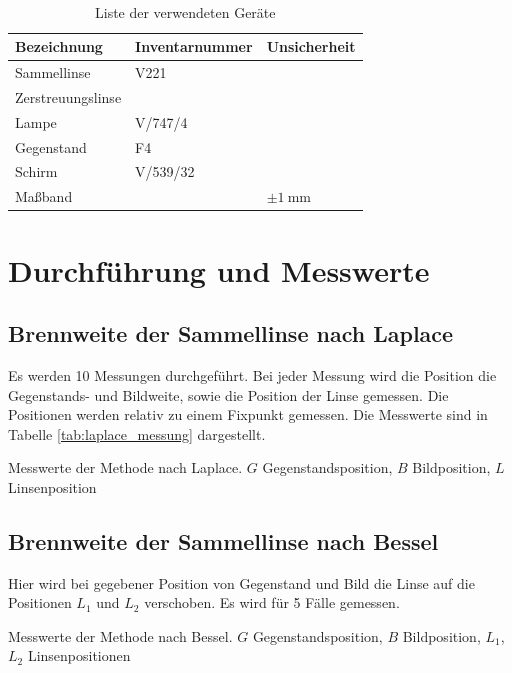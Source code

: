 \documentclass{article}
\begin{document}
\begin{table}[H]
\caption{Liste der verwendeten Geräte}

~

\begin{tabular}{l|ll}
Bezeichnung & Inventarnummer & Unsicherheit \\
\hline
Sammellinse & V221 & \\
Zerstreuungslinse &  & \\
Lampe & V/747/4 & \\
Gegenstand & F4 & \\
Schirm & V/539/32 & \\
Maßband & & $\pm1~$mm
\end{tabular}

\end{table}




\section{Durchführung und Messwerte}

\subsection{Brennweite der Sammellinse nach Laplace}

Es werden 10 Messungen durchgeführt. Bei jeder Messung wird die Position die Gegenstands- und Bildweite, sowie die Position der Linse gemessen. Die Positionen werden relativ zu einem Fixpunkt gemessen. Die Messwerte sind in Tabelle \ref{tab:laplace_messung} dargestellt.

\begin{table}[H]
\caption{Messwerte der Methode nach Laplace. $G$ Gegenstandsposition, $B$ Bildposition, $L$ Linsenposition}
\label{tab:laplace_messung}
\centering

\end{table}

\subsection{Brennweite der Sammellinse nach Bessel}

Hier wird bei gegebener Position von Gegenstand und Bild die Linse auf die Positionen $L_1$ und $L_2$ verschoben. Es wird für 5 Fälle gemessen.


\begin{table}[H]
\caption{Messwerte der Methode nach Bessel. $G$ Gegenstandsposition, $B$ Bildposition, $L_1$, $L_2$ Linsenpositionen}
\label{tab:bessel_messung}
\centering

\end{table}
\end{document}
